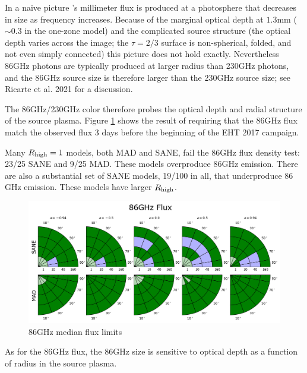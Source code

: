 
In a naive picture \sgra's millimeter flux is produced at a photosphere that decreases in size as frequency increases.  Because of the marginal optical depth at $1.3$mm ($\sim 0.3$ in the one-zone model) and the complicated source structure (the optical depth varies across the image; the $\tau = 2/3$ surface is non-spherical, folded, and not even simply connected) this picture does not hold exactly.  Nevertheless 86GHz photons are typically produced at larger radius than 230GHz photons, and the 86GHz source size is therefore larger than the 230GHz source size; see Ricarte et al. 2021 for a discussion.

The 86GHz/230GHz color therefore probes the optical depth and radial structure of the source plasma.  Figure \ref{fig:cmp_86ghz_flux} shows the result of requiring that the 86GHz flux match the observed flux 3 days before the beginning of the EHT 2017 campaign.

Many $R_\mathrm{high} = 1$ models, both MAD and SANE, fail the $86$GHz flux density test: 23/25 SANE and 9/25 MAD.  These models overproduce $86$GHz emission.
There are also a substantial set of SANE models, 19/100 in all, that underproduce $86$GHz emission.  These models have larger $R_\mathrm{high}$.

\begin{figure}
  \centering
  \includegraphics[width=\columnwidth]{./figures/86GHz_flux_Constraints.png}
  \caption{86GHz median flux limits}
  \label{fig:cmp_86ghz_flux}
\end{figure}



As for the $86$GHz flux, the $86$GHz size is sensitive to optical depth as a function of radius in the source plasma.

